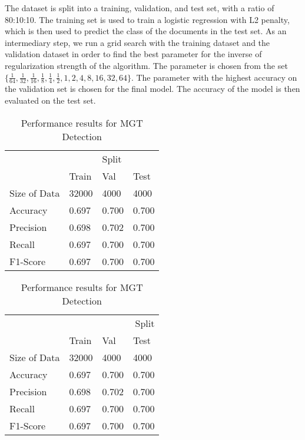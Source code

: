 The dataset is split into a training, validation, and test set, with a ratio of 80:10:10. The training set is used to train a logistic regression with L2 penalty, which is then used to predict the class of the documents in the test set. As an intermediary step, we run a grid search with the training dataset and the validation dataset in order to find the best parameter for the inverse of regularization strength of the algorithm. The parameter is chosen from the set $\{\frac{1}{64}, \frac{1}{32}, \frac{1}{16}, \frac{1}{8}, \frac{1}{4}, \frac{1}{2}, 1, 2, 4, 8 , 16, 32 , 64\}$. The parameter with the highest accuracy on the validation set is chosen for the final model. The accuracy of the model is then evaluated on the test set. 

\begin{table}[htbp]
    \centering
    \caption{Performance results for MGT Detection}
    \label{tab:mgt_detection}
    \begin{tabular}{llll}
    \toprule
     & \multicolumn{3}{c}{Split} \\
     \cline{2-4}
     & Train & Val & Test \\
    \midrule 
    Size of Data & 32000 & 4000 & 4000 \\
    Accuracy & 0.697 & 0.700 & 0.700 \\
    Precision & 0.698 & 0.702 & 0.700 \\
    Recall & 0.697 & 0.700 & 0.700 \\
    F1-Score & 0.697 & 0.700 & 0.700 \\
    \bottomrule
    \end{tabular}
    \end{table}

    \begin{table}[htbp]
        \centering
        \caption{Performance results for MGT Detection}
        \label{tab:mgt_detection}
        \begin{tabular}{llll}
        \toprule
         & \multicolumn{3}{r}{Split} \\
         & Train & Val & Test \\
        \midrule
        Size of Data & 32000 & 4000 & 4000 \\
        \cline{1-1}
        Accuracy & 0.697 & 0.700 & 0.700 \\
        \cline{1-1}
        Precision & 0.698 & 0.702 & 0.700 \\
        \cline{1-1}
        Recall & 0.697 & 0.700 & 0.700 \\
        \cline{1-1}
        F1-Score & 0.697 & 0.700 & 0.700 \\
        \cline{1-1}
        \bottomrule
        \end{tabular}
        \end{table}


